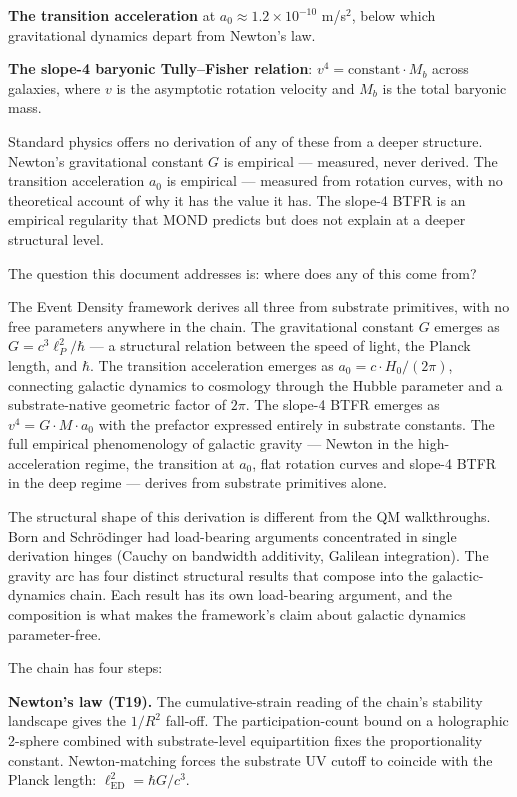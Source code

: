 \documentclass[11pt,a4paper]{article}
\begin{document}
\textbf{The transition acceleration} at $a_0 \approx 1.2 \times 10^{-10}$ m/s$^2$, below which gravitational dynamics depart from Newton's law.

\textbf{The slope-4 baryonic Tully--Fisher relation}: $v^4 = \text{constant} \cdot M_b$ across galaxies, where $v$ is the asymptotic rotation velocity and $M_b$ is the total baryonic mass.

Standard physics offers no derivation of any of these from a deeper structure. Newton's gravitational constant $G$ is empirical --- measured, never derived. The transition acceleration $a_0$ is empirical --- measured from rotation curves, with no theoretical account of why it has the value it has. The slope-4 BTFR is an empirical regularity that MOND predicts but does not explain at a deeper structural level.

The question this document addresses is: where does any of this come from?

The Event Density framework derives all three from substrate primitives, with no free parameters anywhere in the chain. The gravitational constant $G$ emerges as $G = c^3\ell_P^2/\hbar$ --- a structural relation between the speed of light, the Planck length, and $\hbar$. The transition acceleration emerges as $a_0 = c\cdot H_0/(2\pi)$, connecting galactic dynamics to cosmology through the Hubble parameter and a substrate-native geometric factor of $2\pi$. The slope-4 BTFR emerges as $v^4 = G\cdot M\cdot a_0$ with the prefactor expressed entirely in substrate constants. The full empirical phenomenology of galactic gravity --- Newton in the high-acceleration regime, the transition at $a_0$, flat rotation curves and slope-4 BTFR in the deep regime --- derives from substrate primitives alone.

The structural shape of this derivation is different from the QM walkthroughs. Born and Schr\"odinger had load-bearing arguments concentrated in single derivation hinges (Cauchy on bandwidth additivity, Galilean integration). The gravity arc has four distinct structural results that compose into the galactic-dynamics chain. Each result has its own load-bearing argument, and the composition is what makes the framework's claim about galactic dynamics parameter-free.

The chain has four steps:

\textbf{Newton's law (T19).} The cumulative-strain reading of the chain's stability landscape gives the $1/R^2$ fall-off. The participation-count bound on a holographic 2-sphere combined with substrate-level equipartition fixes the proportionality constant. Newton-matching forces the substrate UV cutoff to coincide with the Planck length: $\ell_{\mathrm{ED}}^2 = \hbar G/c^3$.
\end{document}
